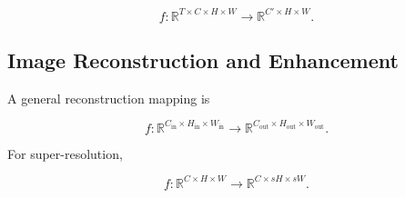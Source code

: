 \documentclass[
    11pt,
    a4paper,
    parskip=half,
    bibliography=totoc,
    numbers=noenddot
]{scrartcl}
\begin{document}
\[
f:
\mathbb{R}^{T\times C\times H\times W}
\rightarrow
\mathbb{R}^{C'\times H\times W}.
\]

\subsection{Image Reconstruction and Enhancement}

A general reconstruction mapping is

\[
f:
\mathbb{R}^{C_{\mathrm{in}}\times H_{\mathrm{in}}\times W_{\mathrm{in}}}
\rightarrow
\mathbb{R}^{C_{\mathrm{out}}\times H_{\mathrm{out}}\times W_{\mathrm{out}}}.
\]

For super-resolution,

\[
f:
\mathbb{R}^{C\times H\times W}
\rightarrow
\mathbb{R}^{C\times sH\times sW}.
\]

\end{document}
